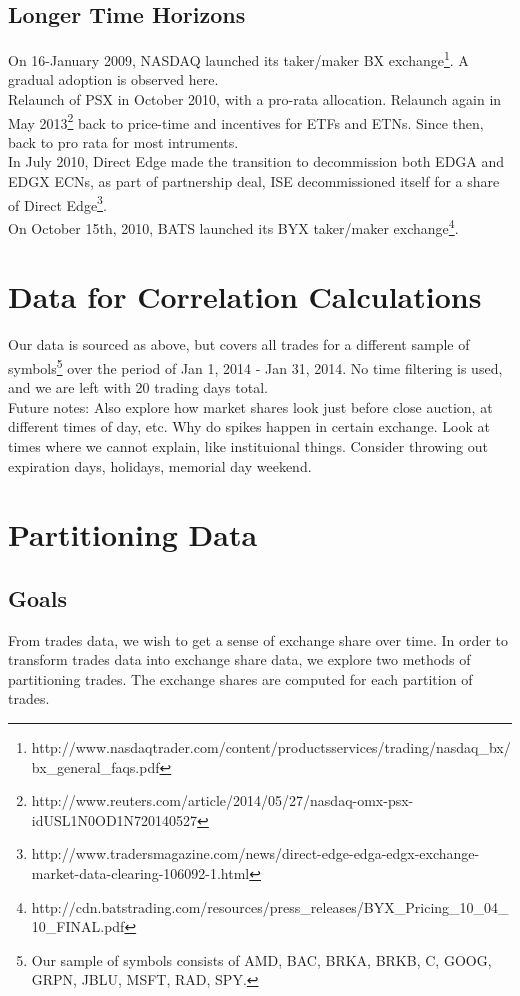 \documentclass{article}
\begin{document}
\subsection{Longer Time Horizons}
On 16-January 2009, NASDAQ launched its taker/maker BX exchange\footnote{http://www.nasdaqtrader.com/content/productsservices/trading/nasdaq\_bx/bx\_general\_faqs.pdf}. A gradual adoption is observed here.\\
Relaunch of PSX in October 2010, with a pro-rata allocation. Relaunch again in May 2013\footnote{http://www.reuters.com/article/2014/05/27/nasdaq-omx-psx-idUSL1N0OD1N720140527} back to price-time and incentives for ETFs and ETNs. Since then, back to pro rata for most intruments.\\
In July 2010, Direct Edge made the transition to decommission both EDGA and EDGX ECNs, as part of partnership deal, ISE decommissioned itself for a share of Direct Edge\footnote{http://www.tradersmagazine.com/news/direct-edge-edga-edgx-exchange-market-data-clearing-106092-1.html}.\\
On October 15th, 2010, BATS launched its BYX taker/maker exchange\footnote{http://cdn.batstrading.com/resources/press\_releases/BYX\_Pricing\_10\_04\_10\_FINAL.pdf}.\\

\section{Data for Correlation Calculations}
Our data is sourced as above, but covers all trades for a different sample of symbols\footnote{Our sample of symbols consists of AMD, BAC, BRKA, BRKB, C, GOOG, GRPN, JBLU, MSFT, RAD, SPY.} over the period of Jan 1, 2014 - Jan 31, 2014. No time filtering is used, and we are left with 20 trading days total.\\

Future notes: Also explore how market shares look just before close auction, at different times of day, etc. Why do spikes happen in certain exchange. Look at times where we cannot explain, like instituional things. Consider throwing out expiration days, holidays, memorial day weekend.\\		

\section{Partitioning Data}
\subsection{Goals}
From trades data, we wish to get a sense of exchange share over time. In order to transform trades data into exchange share data, we explore two methods of partitioning trades. The exchange shares are computed for each partition of trades.\\
\end{document}
